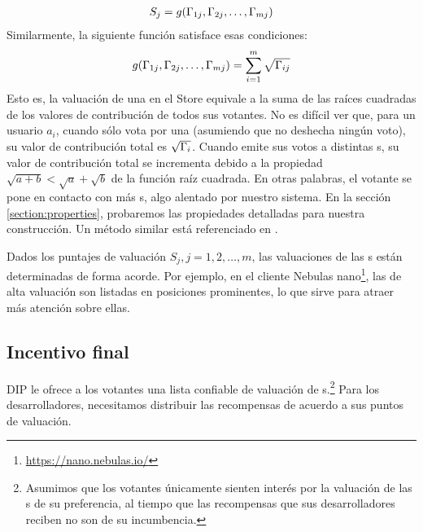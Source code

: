 \begin{align}
	S_j = g(\Gamma_{1j},\Gamma_{2j},\ldots,\Gamma_{mj})
\end{align}
Similarmente, la siguiente función satisface esas condiciones:
\begin{align}
	\label{eq:sqrt}
	g(\Gamma_{1j},\Gamma_{2j},\ldots,\Gamma_{mj}) = \sum_{i=1}^m \sqrt{\Gamma_{ij}}
\end{align}
Esto es, la valuación de una \dapp en el Store equivale a la suma de las raíces cuadradas de los valores de contribución de todos sus votantes. No es difícil ver que, para un usuario
$a_i$, cuando sólo vota por una \dapp (asumiendo que no deshecha ningún voto), su valor de contribución total es $\sqrt{\Gamma_i}$. Cuando emite sus votos a distintas {\dapp}s, su valor de contribución total se incrementa debido a la propiedad $\sqrt{a+b}<\sqrt{a}+\sqrt{b}$ de la función raíz cuadrada. En otras palabras, el votante se pone en contacto con más {\dapp}s, algo alentado por nuestro sistema. En la sección \ref{section:properties}, probaremos las propiedades detalladas para nuestra construcción. Un método similar está referenciado en \cite{buterin2018liberal}.

Dados los puntajes de valuación $S_j,j=1,2,\ldots,m$, las valuaciones de las {\dapp}s están determinadas de forma acorde. Por ejemplo, en el cliente Nebulas nano\footnote{\url{https://nano.nebulas.io/}}, las \dapp de alta valuación son listadas en posiciones prominentes, lo que sirve para atraer más atención sobre ellas.

\subsection{Incentivo final}
\noindent DIP le ofrece a los votantes una lista confiable de valuación de {\dapp}s.\footnote{Asumimos que los votantes únicamente sienten interés por la valuación de las {\dapp}s de su preferencia, al tiempo que las recompensas que sus desarrolladores reciben no son de su incumbencia.} Para los desarrolladores, necesitamos distribuir las recompensas de acuerdo a sus puntos de valuación.

